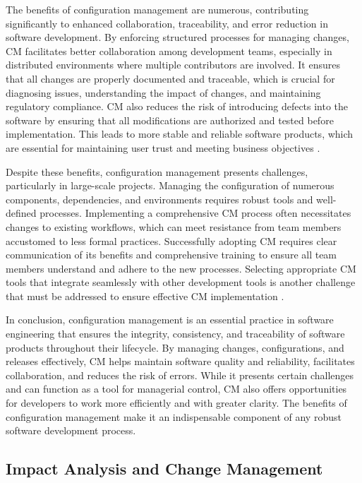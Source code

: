 \begin{refsection}
The benefits of configuration management are numerous, contributing significantly to enhanced collaboration, traceability, and error reduction in software development. By enforcing structured processes for managing changes, CM facilitates better collaboration among development teams, especially in distributed environments where multiple contributors are involved. It ensures that all changes are properly documented and traceable, which is crucial for diagnosing issues, understanding the impact of changes, and maintaining regulatory compliance. CM also reduces the risk of introducing defects into the software by ensuring that all modifications are authorized and tested before implementation. This leads to more stable and reliable software products, which are essential for maintaining user trust and meeting business objectives \cite[pp.~91-93]{crispin2021agile}.

Despite these benefits, configuration management presents challenges, particularly in large-scale projects. Managing the configuration of numerous components, dependencies, and environments requires robust tools and well-defined processes. Implementing a comprehensive CM process often necessitates changes to existing workflows, which can meet resistance from team members accustomed to less formal practices. Successfully adopting CM requires clear communication of its benefits and comprehensive training to ensure all team members understand and adhere to the new processes. Selecting appropriate CM tools that integrate seamlessly with other development tools is another challenge that must be addressed to ensure effective CM implementation \cite[pp.~49-51]{babich1986software}.

In conclusion, configuration management is an essential practice in software engineering that ensures the integrity, consistency, and traceability of software products throughout their lifecycle. By managing changes, configurations, and releases effectively, CM helps maintain software quality and reliability, facilitates collaboration, and reduces the risk of errors. While it presents certain challenges and can function as a tool for managerial control, CM also offers opportunities for developers to work more efficiently and with greater clarity. The benefits of configuration management make it an indispensable component of any robust software development process.

\subsection{Impact Analysis and Change Management}


\end{refsection}
